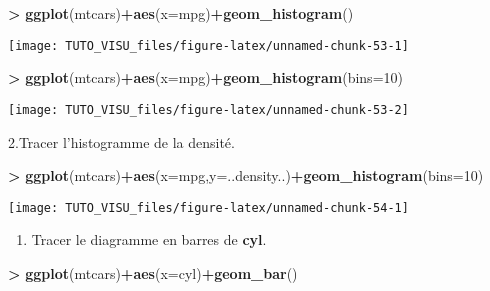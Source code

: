 \documentclass[]{article}
\newenvironment{Shaded}{\begin{snugshade}}{\end{snugshade}}
\newcommand{\DataTypeTok}[1]{\textcolor[rgb]{0.13,0.29,0.53}{#1}}
\newcommand{\DecValTok}[1]{\textcolor[rgb]{0.00,0.00,0.81}{#1}}
\newcommand{\KeywordTok}[1]{\textcolor[rgb]{0.13,0.29,0.53}{\textbf{#1}}}
\newcommand{\NormalTok}[1]{#1}
\newcommand{\OperatorTok}[1]{\textcolor[rgb]{0.81,0.36,0.00}{\textbf{#1}}}
\newcommand{\StringTok}[1]{\textcolor[rgb]{0.31,0.60,0.02}{#1}}
\providecommand{\tightlist}{%
  \setlength{\itemsep}{0pt}\setlength{\parskip}{0pt}}
\theoremstyle{definition}
\theoremstyle{definition}
\theoremstyle{definition}
\theoremstyle{remark}
\begin{document}
\begin{Shaded}
\begin{Highlighting}[]
\OperatorTok{>}\StringTok{ }\KeywordTok{ggplot}\NormalTok{(mtcars)}\OperatorTok{+}\KeywordTok{aes}\NormalTok{(}\DataTypeTok{x=}\NormalTok{mpg)}\OperatorTok{+}\KeywordTok{geom_histogram}\NormalTok{()}
\end{Highlighting}
\end{Shaded}

\begin{center}\texttt{[image: TUTO\_VISU\_files/figure-latex/unnamed-chunk-53-1]} \end{center}

\begin{Shaded}
\begin{Highlighting}[]
\OperatorTok{>}\StringTok{ }\KeywordTok{ggplot}\NormalTok{(mtcars)}\OperatorTok{+}\KeywordTok{aes}\NormalTok{(}\DataTypeTok{x=}\NormalTok{mpg)}\OperatorTok{+}\KeywordTok{geom_histogram}\NormalTok{(}\DataTypeTok{bins=}\DecValTok{10}\NormalTok{)}
\end{Highlighting}
\end{Shaded}

\begin{center}\texttt{[image: TUTO\_VISU\_files/figure-latex/unnamed-chunk-53-2]} \end{center}

2.Tracer l'histogramme de la densité.

\begin{Shaded}
\begin{Highlighting}[]
\OperatorTok{>}\StringTok{ }\KeywordTok{ggplot}\NormalTok{(mtcars)}\OperatorTok{+}\KeywordTok{aes}\NormalTok{(}\DataTypeTok{x=}\NormalTok{mpg,}\DataTypeTok{y=}\NormalTok{..density..)}\OperatorTok{+}\KeywordTok{geom_histogram}\NormalTok{(}\DataTypeTok{bins=}\DecValTok{10}\NormalTok{)}
\end{Highlighting}
\end{Shaded}

\begin{center}\texttt{[image: TUTO\_VISU\_files/figure-latex/unnamed-chunk-54-1]} \end{center}

\begin{enumerate}
\def\labelenumi{\arabic{enumi}.}
\setcounter{enumi}{2}
\tightlist
\item
  Tracer le diagramme en barres de \textbf{cyl}.
\end{enumerate}

\begin{Shaded}
\begin{Highlighting}[]
\OperatorTok{>}\StringTok{ }\KeywordTok{ggplot}\NormalTok{(mtcars)}\OperatorTok{+}\KeywordTok{aes}\NormalTok{(}\DataTypeTok{x=}\NormalTok{cyl)}\OperatorTok{+}\KeywordTok{geom_bar}\NormalTok{()}
\end{Highlighting}
\end{Shaded}
\end{document}
